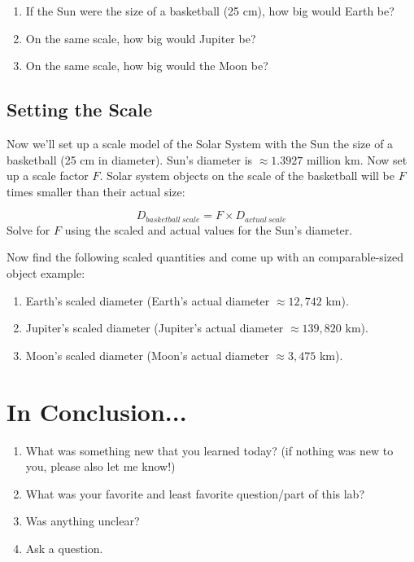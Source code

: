 \documentclass[12pt]{article}
\begin{document}
\begin{enumerate}
\item If the Sun were the size of a basketball (25 cm), how big would Earth be?
\item On the same scale, how big would Jupiter be?
\item On the same scale, how big would the Moon be?
\end{enumerate}

\subsection*{Setting the Scale} \label{calculations}
Now we'll set up a scale model of the Solar System with the Sun the size of a basketball (25 cm in diameter).
Sun's diameter is $\approx 1.3927$ million km. Now set up a scale factor $F$. Solar system objects on the scale of the basketball will be $F$ times smaller than their actual size:

\begin{equation}
D_{basketball~scale} = F\times D_{actual~scale}
\end{equation}
Solve for $F$ using the scaled and actual values for the Sun's diameter.

Now find the following scaled quantities and come up with an comparable-sized object example:
\begin{enumerate}
\item Earth's scaled diameter (Earth's actual diameter $\approx 12,742$ km). 
\item Jupiter's scaled diameter (Jupiter's actual diameter $\approx 139,820$ km). 
\item Moon's scaled diameter (Moon's actual diameter $\approx 3,475$ km). 
\end{enumerate}

\section*{In Conclusion...}
\begin{enumerate}
    \item What was something new that you learned today? (if nothing was new to you, please also let me know!)
    \item What was your favorite and least favorite question/part of this lab?
    \item Was anything unclear?
    \item Ask a question. 
\end{enumerate}
\end{document}
